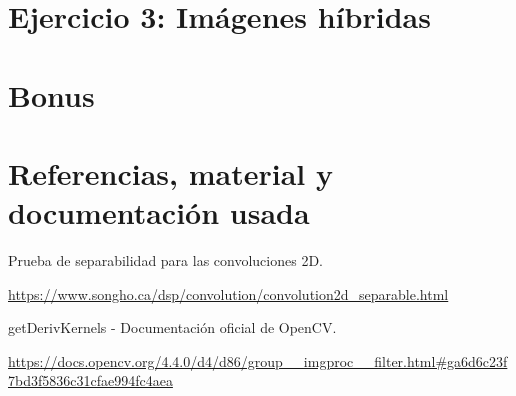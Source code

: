 \documentclass[12pt, spanish]{article}
\begin{document}
\section{Ejercicio 3: Imágenes híbridas}



\section{Bonus}

\newpage

\section{Referencias, material y documentación usada}


\begin{thebibliography}{9}

	Prueba de separabilidad para las convoluciones 2D.

	\url{https://www.songho.ca/dsp/convolution/convolution2d_separable.html}

	getDerivKernels - Documentación oficial de OpenCV.

	\url{https://docs.opencv.org/4.4.0/d4/d86/group__imgproc__filter.html#ga6d6c23f7bd3f5836c31cfae994fc4aea}

\end{thebibliography}
\end{document}
